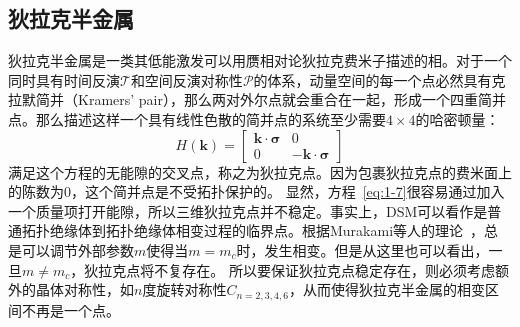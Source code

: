 \subsection{狄拉克半金属}\label{sec:dirac}
狄拉克半金属是一类其低能激发可以用赝相对论狄拉克费米子描述的相。对于一个同时具有时间反演$\mathcal{T}$和空间反演对称性$\mathcal{P}$的体系，动量空间的每一个点必然具有克拉默简并（Kramers' pair），那么两对外尔点就会重合在一起，形成一个四重简并点。那么描述这样一个具有线性色散的简并点的系统至少需要$4\times4$的哈密顿量：
\begin{equation}
    \label{eq:1-9}
    H(\mathbf{k})=\left[\begin{array}{cc}
    \mathbf{k} \cdot \boldsymbol{\sigma} & 0 \\
    0 & -\mathbf{k} \cdot \boldsymbol{\sigma}
    \end{array}\right]
\end{equation}
满足这个方程的无能隙的交叉点，称之为狄拉克点。因为包裹狄拉克点的费米面上的陈数为0，这个简并点是不受拓扑保护的。
显然，方程~\ref{eq:1-7}很容易通过加入一个质量项打开能隙，所以三维狄拉克点并不稳定。事实上，DSM可以看作是普通拓扑绝缘体到拓扑绝缘体相变过程的临界点。根据Murakami等人的理论~\citep{Murakami_2007,Murakami2}，总是可以调节外部参数$m$使得当$m=m_c$时，发生相变。但是从这里也可以看出，一旦$m\neq m_c$，狄拉克点将不复存在。
所以要保证狄拉克点稳定存在，则必须考虑额外的晶体对称性，如$n$度旋转对称性$C_{n=2,3,4,6}$，从而使得狄拉克半金属的相变区间不再是一个点。

